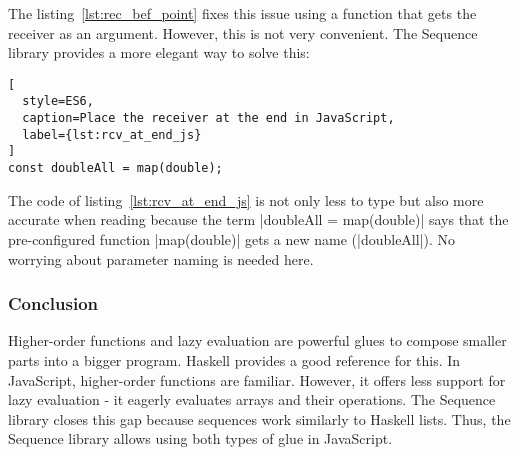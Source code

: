 The listing~\ref{lst:rec_bef_point} fixes this issue using a function that gets
the receiver as an argument. However, this is not very convenient. The Sequence
library provides a more elegant way to solve this:

\begin{lstlisting}[
  style=ES6,
  caption=Place the receiver at the end in JavaScript,
  label={lst:rcv_at_end_js}
]
const doubleAll = map(double);
\end{lstlisting}

The code of listing~\ref{lst:rcv_at_end_js} is not only less to type but also
more accurate when reading because the term |doubleAll = map(double)| says that
the pre-configured function |map(double)| gets a new name (|doubleAll|). No worrying about
parameter naming is needed here.

\subsubsection{Conclusion} %
\label{subsub:modularizing_programs_conclusion}
Higher-order functions and lazy evaluation are powerful glues to compose
smaller parts into a bigger program. Haskell provides a good reference for
this. In JavaScript, higher-order functions are familiar. However, it
offers less support for lazy evaluation - it eagerly evaluates arrays and their
operations. The Sequence library closes this gap because sequences work
similarly to Haskell lists. Thus, the Sequence library allows using both types
of glue in JavaScript.
